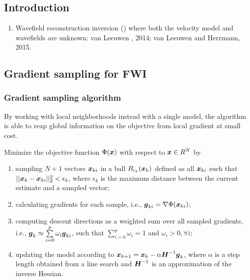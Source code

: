 \renewcommand{\pmk}{Louboutin\_2017\_EAGE\_Gradient sampling algorithm}
\renewcommand{\prf}{FWI/\pmk.pdf}
\renewcommand{\pti}{Extending the Search Space of Time-domain Adjoint-state FWI
with Randomized Implicit Time Shifts}
\renewcommand{\pay}{M. Louboutin, F. J. Herrmann, 2017}
\renewcommand{\pjo}{79th EAGE Conference \& Exhibition}
\renewcommand{\pda}{2018/12/5 Wen.}

\section{\pinfo}
\subsection{Introduction}
\begin{enumerate}[\hspace{10mm}*]
  \item Wavefield reconstruction inversion ()
    where both the velocity model and wavefields are unknown:
    van Leeuwen \etal, 2014; van Leeuwen and Herrmann, 2015.
\end{enumerate}

\subsection{Gradient sampling for FWI}
\subsubsection{Gradient sampling algorithm}
By working with local neighborhoods instead with a single model,
the algorithm is able to reap global information on the objective from local gradient at small cost.

Minimize the objective function $\Phi(\boldsymbol{x})$ with respect to $\boldsymbol{x}\in R^N$ by
\begin{enumerate}[\hspace{10mm}$\bullet$]
  \item sampling $N+1$ vectors $\boldsymbol{x}_{ki}$ in a ball $B_{\epsilon_k}(\boldsymbol{x}_k)$
    defined as all $\boldsymbol{x}_{ki}$ such that $||\boldsymbol{x}_k-\boldsymbol{x}_{ki}||_2^2<\epsilon_k$,
    where $\epsilon_k$ is the maximum distance between the current estimate and a sampled vector;
  \item calculating gradients for each sample, i.e., $\boldsymbol{g}_{ki}=\nabla\Phi(\boldsymbol{x}_{ki})$;
  \item computing descent directions as a weighted sum over all sampled gradients,
    i.e., $\boldsymbol{g}_k\approx\sum\limits_{i=0}^p\omega_i\boldsymbol{g}_{ki}$,
    such that $\sum\limits_{i=0}^p\omega_i=1$ and $\omega_i>0,\forall i$;
  \item updating the model according to $\boldsymbol{x}_{k+1}=\boldsymbol{x}_k-\alpha\boldsymbol{H}^{-1}\boldsymbol{g}_k$,
    where $\alpha$ is a step length obtained from a line search
    and $\boldsymbol{H}^{-1}$ is an approximation of the inverse Hessian.
\end{enumerate}

